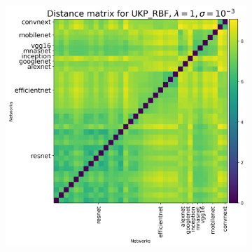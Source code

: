 \documentclass{article}
\theoremstyle{plain}
\begin{document}
\begin{figure}[!h]
\begin{subfigure}[b]{0.3\textwidth}
    \end{subfigure}
    \hfill
    \begin{subfigure}[b]{0.3\textwidth}
        \includegraphics[width=\textwidth]{Appendix figures/imagenet_experiments/Heatmaps final/Heatmap for UKP_dist_RBF_1.000000e+00_1.000000e-03.png}
    \end{subfigure}
    
    \vspace{0.5cm}  %
    

\end{figure}
\end{document}

